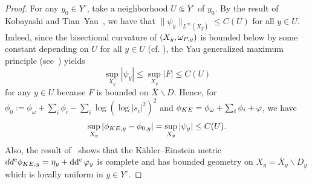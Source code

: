 \documentclass[a4paper, 11pt]{amsart}
\theoremstyle{plain}
\numberwithin{equation}{section} %
\numberwithin{figure}{section} %
\theoremstyle{plain}
\theoremstyle{plain}
\theoremstyle{plain}
\theoremstyle{plain}
\theoremstyle{remark}
\theoremstyle{definition}
\theoremstyle{definition}
\DeclareMathOperator \Ric {\textrm{Ric}}
\DeclareMathOperator \ddc{\textrm{dd}^c}
\begin{document}
\begin{proof}
For any $y_0\in Y^\circ$, take a neighborhood $U\Subset Y^\circ$ of $y_0$. 
{By the result of Kobayashi \cite{Kobayashi84-KE-open} and Tian--Yau~\cite{TianYau87-KE-complete}, we have that $\|\psi_y\|_{L^\infty( X_{y})}\leq C(U)$ for all $y\in U$.  Indeed,
since  the bisectional curvature of $(X_y,\omega_{{\rm P},y})$ is bounded below by some constant  depending on $U$ for all $y\in U$ (cf. \cite[Section 4]{guenancia14-kahler-mixed}), the Yau generalized maximum principle (see~\cite[Propotion 4.1]{ChengYau80-complete}) yields \[\sup_{X_y}|\psi_y|\leq \sup_{X_y} |F|\leq C(U) \]
for any $y\in U$ because $F$ is bounded on $\overline{X}\backslash D$.
}
Hence, for $\phi_0:= \phi_\omega+\sum_i \phi_i  -\sum_i\log(\log|s_i|^2)^2$
 and $\phi_{{\rm KE}}= \phi_\omega+\sum_i \phi_i+ \varphi$, we have
\[
\sup_{X_y}|\phi_{{\rm KE}, y}-\phi_{0,y}|= \sup_{X_y}|\psi_{y}|\leq C(U).
\]
Also,  the result of~\cite{Kobayashi84-KE-open,TianYau87-KE-complete} shows that
the K\"ahler--Einstein metric $dd^c \phi_{{\rm KE},y}=\eta_y+\ddc\varphi_y$ is complete and has bounded geometry on $X_y=\overline{X}_y\backslash D_{y}$ which is locally uniform in $y\in Y^\circ$. 



\end{proof}
\end{document}

